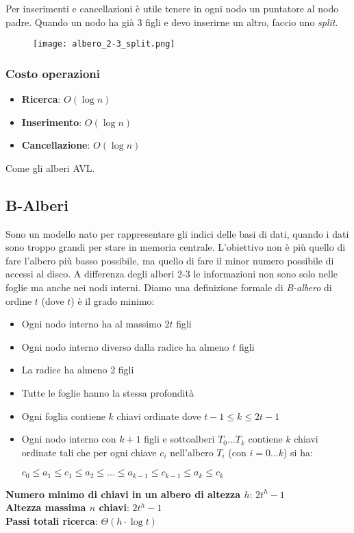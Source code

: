 \noindent Per inserimenti e cancellazioni è utile tenere in ogni nodo un puntatore al nodo padre.
Quando un nodo ha già 3 figli e devo inserirne un altro, faccio uno \emph{split}.
\clearpage
\begin{figure}[h]
    \texttt{[image: albero\_2-3\_split.png]}
\end{figure}
\clearpage
\subsubsection{Costo operazioni}
\begin{itemize}
    \item \textbf{Ricerca}: $O(\log n)$
    \item \textbf{Inserimento}: $O(\log n)$
    \item \textbf{Cancellazione}: $O(\log n)$
\end{itemize}
Come gli alberi AVL.
\subsection{B-Alberi}
Sono un modello nato per rappresentare gli indici delle basi di dati, quando i 
dati sono troppo grandi per stare in memoria centrale. L'obiettivo non è più 
quello di fare l'albero più basso possibile, ma quello di fare il minor numero possibile di 
accessi al disco. A differenza degli alberi 2-3 le informazioni non sono solo nelle foglie
ma anche nei nodi interni.
Diamo una definizione formale di \emph{B-albero} di ordine $t$ (dove $t$) è il grado minimo:
\begin{itemize}
    \item Ogni nodo interno ha al massimo $2t$ figli 
    \item Ogni nodo interno diverso dalla radice ha almeno $t$ figli 
    \item La radice ha almeno 2 figli
    \item Tutte le foglie hanno la stessa profondità 
    \item Ogni foglia contiene $k$ chiavi ordinate dove $t - 1 \le k \le 2t - 1$
    \item Ogni nodo interno con $k + 1$ figli e sottoalberi $T_0...T_k$ contiene 
    $k$ chiavi ordinate tali che per ogni chiave $c_i$ nell'albero $T_i$ (con $i=0...k$) si ha:
    \begin{center}
        $c_0 \le a_1 \le c_1 \le a_2 \le ... \le a_{k-1} \le c_{k-1} \le a_k \le c_k$
    \end{center}
\end{itemize}
\noindent \textbf{Numero minimo di chiavi in un albero di altezza $h$}: $2t^{h}-1$\\
\textbf{Altezza massima $n$ chiavi}: $2t^{h}-1$\\
\textbf{Passi totali ricerca}: $\Theta(h \cdot \log t)$\\


